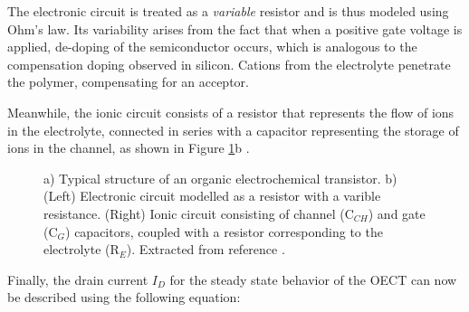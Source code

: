 The electronic circuit is treated as a \textit{variable} resistor and is thus modeled using Ohm's law. Its variability arises from the fact that when a positive gate voltage is applied, de-doping of the semiconductor occurs, which is analogous to the compensation doping observed in silicon. Cations from the electrolyte penetrate the polymer, compensating for an acceptor. 

Meanwhile, the ionic circuit consists of a resistor that represents the flow of ions in the electrolyte, connected in series with a capacitor representing the storage of ions in the channel, as shown in Figure \ref{fig:bernard}b  \cite{rivnayOrganicElectrochemicalTransistors2018}\cite{bernardsSteadyStateTransientBehavior2007}. 

\begin{figure}[ht]
	\centering
	\hspace{2em}
	\caption[Typical OECT structure and circuit model]{a) Typical structure of an organic electrochemical transistor. b) (Left) Electronic circuit modelled as a resistor with a varible resistance. (Right) Ionic circuit consisting of channel (C$_{CH}$) and gate (C$_{G}$) capacitors, coupled with a resistor corresponding to the electrolyte (R$_{E}$). Extracted from reference \cite{rivnayOrganicElectrochemicalTransistors2018}.}
	\label{fig:bernard}
\end{figure}

Finally, the drain current $I_{D}$ for the steady state behavior of the OECT can now be described using the following equation:

